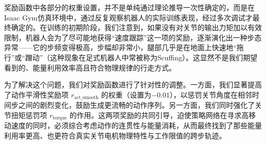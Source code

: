 奖励函数中各部分的权重设置，并不是单纯通过理论推导一次性确定的，而是在Isaac Gym仿真环境中，通过反复观察机器人的实际训练表现，经过多次调试才最终确定的。在训练的初期阶段，我们注意到，如果没有对关节的输出力矩加以有效限制，机器人会为了尽可能地获得“速度跟踪”这一项的奖励，逐渐演化出一种步态异常——它的步频变得极高，步幅却非常小，腿部几乎是在地面上快速地“拖行”或“蹭动”（这种现象在足式机器人中常被称为Scuffing）。这显然不是我们期望看到的、能量利用效率高且符合物理规律的行走方式。

为了解决这个问题，我们对奖励函数进行了针对性的调整。一方面，我们显著提高了动作平滑性奖励项 $r_{\text{act\_smooth}}$ 的权重（设置为$-0.01$），以惩罚关节角度在相邻时间步之间的剧烈变化，鼓励生成更流畅的动作序列。另一方面，我们同时强化了关节扭矩惩罚项 $r_{\text{torque}}$ 的作用。这两项奖励的共同引导，迫使策略网络在寻求高移动速度的同时，必须综合考虑动作的连贯性与能量消耗，从而最终找到了那些能量利用率更高、也更符合真实关节电机物理特性与工作限值的跨步轨迹。

